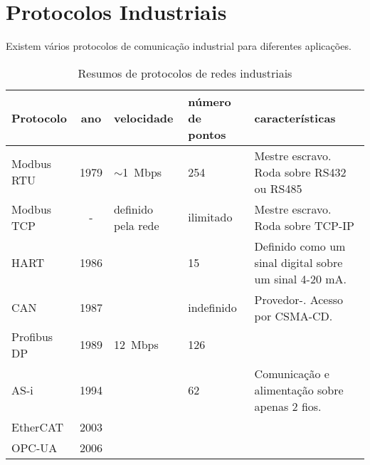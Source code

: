 \section{Protocolos Industriais}

Existem vários protocolos de comunicação industrial para diferentes aplicações.

\begin{table}[h]
    \caption{Resumos de protocolos de redes industriais}\label{tab:protocolos}
    \begin{tabular}{l|cp{20mm}p{20mm}p{35mm}}
        \hline
        Protocolo & ano & velocidade & número de pontos & características\\
        \hline
        Modbus RTU & 1979 & $\sim$1~Mbps & 254 & Mestre escravo. Roda sobre RS432 ou RS485\\
        Modbus TCP & - & definido pela rede & ilimitado & Mestre escravo. Roda sobre TCP-IP\\
        HART & 1986 & & 15 & Definido como um sinal digital sobre um sinal 4-20 mA.\\
        CAN & 1987 & & indefinido & Provedor-. Acesso por CSMA-CD.\\
        Profibus DP & 1989 & 12~Mbps & 126 & \\
        AS-i & 1994 & & 62 & Comunicação e alimentação sobre apenas 2 fios.\\
        EtherCAT & 2003 & & & \\
        OPC-UA & 2006 & & & \\
        \hline
    \end{tabular}
\end{table}

